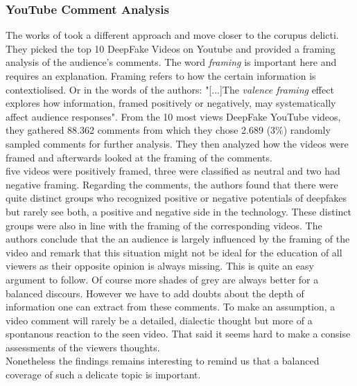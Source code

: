 \documentclass[
  a4paper,  %
  twoside,  %
  bibliography=totoc,
  headsepline,
  cleardoublepage=empty,
  parskip=half,
  draft=false
]{scrbook}
\begin{document}
\subsubsection*{YouTube Comment Analysis}
The works of \citeauthor{leeBelieveNotBelieve2021} took a different approach and move closer to the corupus delicti. They picked the top 10 DeepFake Videos on Youtube and provided a framing analysis of the audience's comments. The word \textit{framing} is important here and requires an explanation. Framing refers to how the certain information is contextiolised. Or in the words of the authors: "[...]The \textit{valence framing} effect explores how information, framed positively or negatively, may systematically affect audience responses". From the 10 most views DeepFake YouTube videos, they gathered 88.362 comments from which they chose 2.689 (3\%) randomly sampled comments for further analysis. They then analyzed how the videos were framed and afterwards looked at the framing of the comments.\\
five videos were positively framed, three were classified as neutral and two had negative framing. Regarding the comments, the authors found that there were quite distinct groups who recognized positive or negative potentials of deepfakes but rarely see both, a positive and negative side in the technology. These distinct groups were also in line with the framing of the corresponding videos. The authors conclude that the an audience is largely influenced by the framing of the video and remark that this situation might not be ideal for the education of all viewers as their opposite opinion is always missing. This is quite an easy argument to follow. Of course more shades of grey are always better for a balanced discours. However we have to add doubts about the depth of information one can extract from these comments. To make an assumption, a video comment will rarely be a detailed, dialectic thought but more of a spontanous reaction to the seen video. That said it seems hard to make a consise assessments of the viewers thoughts. \\
Nonetheless the findings remains interesting to remind us that a balanced coverage of such a delicate topic is important.
\end{document}
